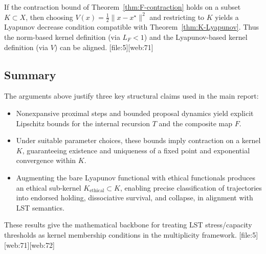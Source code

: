 \documentclass[11pt]{article}
\begin{document}
\begin{corollary}
If the contraction bound of Theorem~\ref{thm:F-contraction} holds on a subset \(K\subset X\), then choosing \(V(x) = \frac{1}{2}\|x - x^\star\|^2\) and restricting to \(K\) yields a Lyapunov decrease condition compatible with Theorem~\ref{thm:K-Lyapunov}. Thus the norm-based kernel definition (via \(L_F<1\)) and the Lyapunov-based kernel definition (via \(V\)) can be aligned. [file:5][web:71]
\end{corollary}

\subsection{Summary}

The arguments above justify three key structural claims used in the main report:

\begin{itemize}[leftmargin=*]
  \item Nonexpansive proximal steps and bounded proposal dynamics yield explicit Lipschitz bounds for the internal recursion \(T\) and the composite map \(F\).
  \item Under suitable parameter choices, these bounds imply contraction on a kernel \(K\), guaranteeing existence and uniqueness of a fixed point and exponential convergence within \(K\).
  \item Augmenting the bare Lyapunov functional with ethical functionals produces an ethical sub-kernel \(K_{\text{ethical}}\subset K\), enabling precise classification of trajectories into endorsed holding, dissociative survival, and collapse, in alignment with LST semantics.
\end{itemize}

These results give the mathematical backbone for treating LST stress/capacity thresholds as kernel membership conditions in the multiplicity framework. [file:5][web:71][web:72]

\nocite{*}


\end{document}
